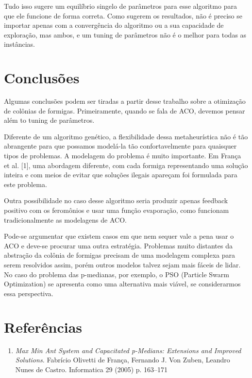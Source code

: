\documentclass[11pt]{article}
\begin{document}
Tudo isso sugere um equilíbrio singelo de parâmetros para esse algoritmo para que ele funcione de forma correta. Como sugerem os resultados, não é preciso se importar apenas com a convergência do algoritmo ou a sua capacidade de exploração, mas ambos, e um tuning de parâmetros não é o melhor para todas as instâncias.

\section{Conclusões}

Algumas conclusões podem ser tiradas a partir desse trabalho sobre a otimização de colônias de formigas. Primeiramente, quando se fala de ACO, devemos pensar além to tuning de parâmetros.

Diferente de um algoritmo genético, a flexibilidade dessa metaheurística não é tão abrangente para que possamos modelá-la tão confortavelmente para quaisquer tipos de problemas. A modelagem do problema é muito importante. Em França et al. [1], uma abordagem diferente, com cada formiga representando uma solução inteira e com meios de evitar que soluções ilegais apareçam foi formulada para este problema.

Outra possibilidade no caso desse algoritmo seria produzir apenas feedback positivo com os feromônios e usar uma função evaporação, como funcionam tradicionalmente as modelagens de ACO.

Pode-se argumentar que existem casos em que nem sequer vale a pena usar o ACO e deve-se procurar uma outra estratégia. Problemas muito distantes da abstração da colônia de formigas precisam de uma modelagem complexa para serem resolvidos assim, porém outros modelos talvez sejam mais fáceis de lidar. No caso do problema das p-medianas, por exemplo, o PSO (Particle Swarm Optimization) se apresenta como uma alternativa mais viável, se considerarmos essa perspectiva.

\section{Referências}

\begin{enumerate}
	\item \textit{Max Min Ant System and Capacitated p-Medians: Extensions and
Improved Solutions.} Fabrício Olivetti de França, Fernando J. Von Zuben, Leandro Nunes de Castro. Informatica 29 (2005) p. 163–171
\end{enumerate}
\end{document}
